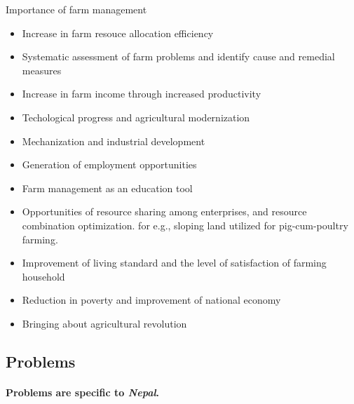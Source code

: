 \documentclass[12pt,ignorenonframetext,aspectratio=169]{beamer}
\providecommand{\tightlist}{%
  \setlength{\itemsep}{0pt}\setlength{\parskip}{0pt}}
\begin{document}
\begin{frame}{Importance of farm management}
\protect\hypertarget{importance-of-farm-management}{}

\begin{itemize}
\tightlist
\item
  Increase in farm resouce allocation efficiency
\item
  Systematic assessment of farm problems and identify cause and remedial
  measures
\item
  Increase in farm income through increased productivity
\item
  Techological progress and agricultural modernization
\item
  Mechanization and industrial development
\item
  Generation of employment opportunities
\item
  Farm management as an education tool
\item
  Opportunities of resource sharing among enterprises, and resource
  combination optimization. for e.g., sloping land utilized for
  pig-cum-poultry farming.
\item
  Improvement of living standard and the level of satisfaction of
  farming household
\item
  Reduction in poverty and improvement of national economy
\item
  Bringing about agricultural revolution
\end{itemize}

\end{frame}

\hypertarget{problems}{%
\subsection{Problems}\label{problems}}

\framesubtitle{Problems are specific to \textit{Nepal}.}
\end{document}
